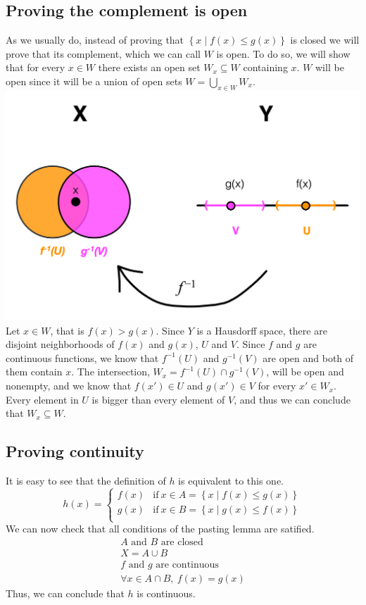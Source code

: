 \documentclass{article}
\begin{document}
\subsection*{Proving the complement is open}
As we usually do, instead of proving that $\left\{x \mid f(x) \leq g(x)\right\}$ is closed we will prove that its complement, which we can call $W$ is open. To do so, we will show that for every $x \in W$ there exists an open set $W_x \subseteq W$ containing $x$. $W$ will be open since it will be a union of open sets $W = \bigcup\limits_{x \in W}W_x$. 
\\
\includegraphics[width=\textwidth]{diagram.png}
Let $x \in W$, that is $f(x) > g(x)$. Since $Y$ is a Hausdorff space, there are disjoint neighborhoods of $f(x)$ and $g(x)$, $U$ and $V$. Since $f$ and $g$ are continuous functions, we know that $f^{-1}(U)$ and $g^{-1}(V)$ are open and both of them contain $x$. The intersection, $W_x = f^{-1}(U) \cap g^{-1}(V)$, will be open and nonempty, and we know that $f(x') \in U$ and $g(x') \in V$ for every $x' \in W_x$. Every element in $U$ is bigger than every element of $V$, and thus we can conclude that $W_x \subseteq W$.
\subsection*{Proving continuity}
It is easy to see that the definition of $h$ is equivalent to this one.
\begin{equation*}
    h(x) = \left\{
        \begin{array}{ll}
        f(x) & \mathrm{if\ } x \in A = \left\{x \mid f(x) \leq g(x)\right\} \\
        g(x) & \mathrm{if\ } x \in B = \left\{x \mid g(x) \leq f(x)\right\} \\
        \end{array}
    \right.
\end{equation*}
We can now check that all conditions of the pasting lemma are satified.
\begin{gather*}
    \text{$A$ and $B$ are closed} \\
    X = A \cup B  \\
    \text{$f$ and $g$ are continuous} \\
    \forall x \in A \cap B,\ f(x) = g(x)
\end{gather*}
Thus, we can conclude that $h$ is continuous.
\end{document}

